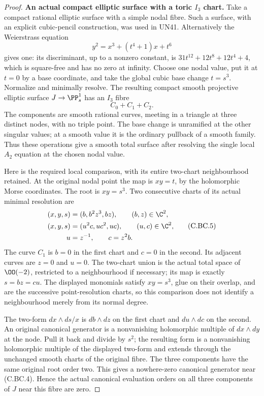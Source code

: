 \begin{proof}
\par\medskip\noindent\textbf{An actual compact elliptic surface with a toric \(I_3\) chart.}
Take a compact rational elliptic surface with a simple nodal fibre.
Such a surface, with an explicit cubic-pencil construction, was
used in UN41. Alternatively the Weierstrass equation
\[
       y^2=x^3+(t^4+1)x+t^6                         \tag{C.BC.3}
\]
gives one: its discriminant, up to a nonzero constant, is
\(31t^{12}+12t^8+12t^4+4\), which is square-free and has no
zero at infinity. Choose one nodal value, put it at \(t=0\)
by a base coordinate, and take the global cubic base change
\(t=s^3\). Normalize and minimally resolve. The resulting
compact smooth projective elliptic surface \(J\to\PP^1_s\)
has an \(I_3\) fibre
\[
                         C_0+C_1+C_2 .             \tag{C.BC.4}
\]
The components are smooth rational curves, meeting in a triangle
at three distinct nodes, with no triple point. The base change
is unramified at the other singular values; at a smooth value
it is the ordinary pullback of a smooth family. Thus these
operations give a smooth total surface after resolving the
single local \(A_2\) equation at the chosen nodal value.

Here is the required local comparison, with its entire two-chart
neighbourhood retained. At the original nodal point the map is
\(xy=t\), by the holomorphic Morse coordinates. The root is
\(xy=s^3\). Two consecutive charts of its actual minimal
resolution are
\[
 \begin{aligned}
 (x,y,s)&=(b,b^2z^3,bz),\qquad (b,z)\in\C^2,\\
 (x,y,s)&=(u^2c,uc^2,uc),\qquad (u,c)\in\C^2,\\
                 u&=z^{-1},\qquad c=z^2b .
 \end{aligned}                                             \tag{C.BC.5}
\]
The curve \(C_1\) is \(b=0\) in the first chart and
\(c=0\) in the second. Its adjacent curves are \(z=0\)
and \(u=0\). The two-chart union is the actual total space
of \(\OO(-2)\), restricted to a neighbourhood if necessary;
its map is exactly \(s=bz=cu\).
The displayed monomials satisfy \(xy=s^3\), glue on their
overlap, and are the successive point-resolution charts,
so this comparison does not identify a neighbourhood merely
from its normal degree.

The two-form \(dx\wedge ds/x\) is \(db\wedge dz\)
on the first chart and \(du\wedge dc\) on the second.
An original canonical generator is a nonvanishing
holomorphic multiple of \(dx\wedge dy\) at the node.
Pull it back and divide by \(s^2\); the resulting
form is a nonvanishing holomorphic multiple of the
displayed two-form and extends through the unchanged
smooth charts of the original fibre. The three
components have the same original root order two.
This gives a nowhere-zero canonical generator
near (C.BC.4). Hence the actual
canonical evaluation orders on all three components of
\(J\) near this fibre are zero.


\end{proof}
